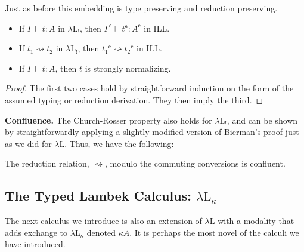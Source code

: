 \documentclass{llncs}
\newcommand{\redto}{\rightsquigarrow}
\newcommand{\Lnt}[1]{\mathit{#1}}
\begin{document}
\noindent
Just as before this embedding is type preserving and reduction preserving.
\begin{theorem}
  \label{theorem:strong_normalization_lambdaL!}
  \begin{itemize}
  \item  If $ \Gamma  \vdash  \Lnt{t}  :  \Lnt{A} $ in $\lambda\text{L}_!$, then
  $  \Gamma ^{\mathsf{e} }   \vdash   \Lnt{t} ^{\mathsf{e} }   :    \Lnt{A} ^{\mathsf{e} }   $ in ILL.

  \item If $ \Lnt{t_{{\mathrm{1}}}}  \rightsquigarrow  \Lnt{t_{{\mathrm{2}}}} $ in $\lambda\text{L}_!$, then $  \Lnt{t_{{\mathrm{1}}}} ^{\mathsf{e} }   \rightsquigarrow    \Lnt{t_{{\mathrm{2}}}} ^{\mathsf{e} }   $ in ILL.
  \item If $ \Gamma  \vdash  \Lnt{t}  :  \Lnt{A} $, then $\Lnt{t}$ is strongly normalizing.  
  \end{itemize}
\end{theorem}
\begin{proof}
  The first two cases hold by straightforward induction on the form of the assumed
  typing or reduction derivation.  They then imply the third.
\end{proof}
\noindent

\textbf{Confluence.} The Church-Rosser property also holds for
$\lambda\text{L}_!$, and can be shown by straightforwardly applying a
slightly modified version of Bierman's proof \cite{Bierman:1994} just
as we did for $\lambda\text{L}$.  Thus, we have the following:
\begin{theorem}[Confluence]
  \label{theorem:confluence}
  The reduction relation, $ \redto $, modulo the commuting conversions
  is confluent.
\end{theorem}

\subsection{The Typed Lambek Calculus: $\lambda\text{L}_\kappa$}
\label{subsec:the_typed_lambek_calculus:lambda-l-kappa}

The next calculus we introduce is also an extension of
$\lambda\text{L}$ with a modality that adds exchange to
$\lambda\text{L}_\kappa$ denoted $ \kappa  \Lnt{A} $.  It is perhaps the most
novel of the calculi we have introduced.
\end{document}
